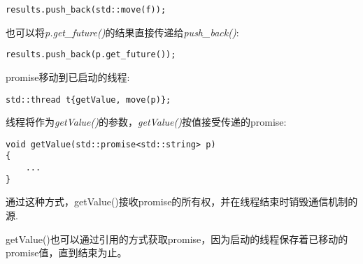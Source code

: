 \begin{lstlisting}[caption={}]
results.push_back(std::move(f));
\end{lstlisting}

也可以将\textit{p.get\_future()}的结果直接传递给\textit{push\_back()}:\par

\begin{lstlisting}[caption={}]
results.push_back(p.get_future());
\end{lstlisting}

promise移动到已启动的线程:\par

\begin{lstlisting}[caption={}]
std::thread t{getValue, move(p)};
\end{lstlisting}

线程将作为\textit{getValue()}的参数，\textit{getValue()}按值接受传递的promise:\par

\begin{lstlisting}[caption={}]
void getValue(std::promise<std::string> p)
{
	...
}
\end{lstlisting}

通过这种方式，getValue()接收promise的所有权，并在线程结束时销毁通信机制的源.\par

getValue()也可以通过引用的方式获取promise，因为启动的线程保存着已移动的promise值，直到结束为止。\par














